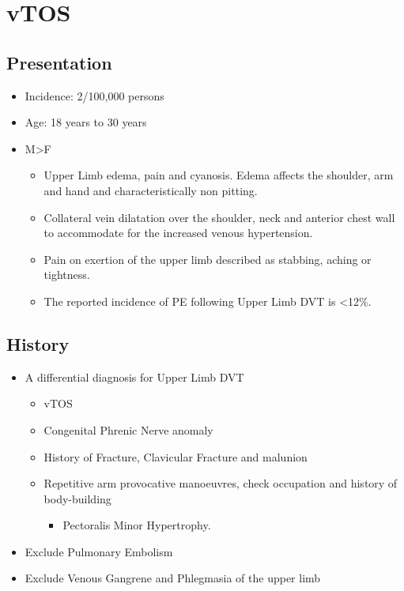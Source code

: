 \documentclass[
]{book}
\providecommand{\tightlist}{%
  \setlength{\itemsep}{0pt}\setlength{\parskip}{0pt}}
\begin{document}
\hypertarget{vtos}{%
\section{vTOS}\label{vtos}}

\hypertarget{presentation}{%
\subsection{Presentation}\label{presentation}}

\begin{itemize}
\item
  Incidence: 2/100,000 persons
\item
  Age: 18 years to 30 years
  \citet{illigComprehensiveReviewPagetSchroetter2010}
\item
  M\textgreater F

  \begin{itemize}
  \item
    Upper Limb edema, pain and cyanosis. Edema affects the shoulder,
    arm and hand and characteristically non pitting.
  \item
    Collateral vein dilatation over the shoulder, neck and anterior
    chest wall to accommodate for the increased venous hypertension.
    \citet{humphries123ThoracicOutlet2019}
  \item
    Pain on exertion of the upper limb described as stabbing, aching
    or tightness.
  \item
    The reported incidence of PE following Upper Limb DVT is \textless12\%.
    \citet{humphries123ThoracicOutlet2019}
  \end{itemize}
\end{itemize}

\hypertarget{history}{%
\subsection{History}\label{history}}

\begin{itemize}
\item
  A differential diagnosis for Upper Limb DVT

  \begin{itemize}
  \item
    vTOS
  \item
    Congenital Phrenic Nerve anomaly
  \item
    History of Fracture, Clavicular Fracture and malunion
  \item
    Repetitive arm provocative manoeuvres, check occupation and
    history of body-building

    \begin{itemize}
    \tightlist
    \item
      Pectoralis Minor Hypertrophy.
    \end{itemize}
  \end{itemize}
\item
  Exclude Pulmonary Embolism~
\item
  Exclude Venous Gangrene and Phlegmasia of the upper limb
\end{itemize}
\end{document}
